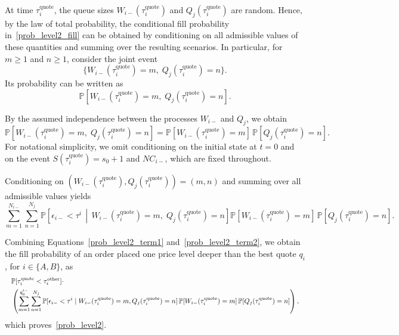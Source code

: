 \documentclass[11pt]{article}
\newenvironment{proof}{\noindent{\it Proof.}}{\hfill\fbox{}\vspace*{1mm}}
\begin{document}
\begin{proof}
At time $\tau_i^{\text{quote}}$, the queue sizes $W_{i-}(\tau_i^{\text{quote}})$ and $Q_j(\tau_i^{\text{quote}})$ are random. Hence, by the law of total probability, the conditional fill probability in~\eqref{prob_level2_fill} can be obtained by conditioning on all admissible values of these quantities and summing over the resulting scenarios. In particular, for $m\geq 1$ and $n\geq 1$, consider the joint event
\[
\{W_{i-}(\tau_i^{\text{quote}})=m,\; Q_j(\tau_i^{\text{quote}})=n\}.
\]
Its probability can be written as
\begin{equation}
\mathbb{P}\!\left[
W_{i-}(\tau_i^{\text{quote}})=m,\;
Q_j(\tau_i^{\text{quote}})=n
\right].
\end{equation}

By the assumed independence between the processes $W_{i-}$ and $Q_j$, we obtain
\begin{equation}\label{prob_level2_combination}
\mathbb{P}\!\left[
W_{i-}(\tau_i^{\text{quote}})=m,\;
Q_j(\tau_i^{\text{quote}})=n
\right]
=
\mathbb{P}[W_{i-}(\tau_i^{\text{quote}})=m]\,
\mathbb{P}[Q_j(\tau_i^{\text{quote}})=n].
\end{equation}
For notational simplicity, we omit conditioning on the initial state at $t=0$ and on the event
$S(\tau_i^{\text{quote}})=s_0+1$ and $NC_{i-}$, which are fixed throughout.

Conditioning on $(W_{i-}(\tau_i^{\text{quote}}),Q_j(\tau_i^{\text{quote}}))=(m,n)$ and summing over all admissible values yields
\begin{equation}\label{prob_level2_term2}
\sum_{m=1}^{N_{i-}}\sum_{n=1}^{N_j}
\mathbb{P}\!\left[
\epsilon_{i-}<\tau^i \,\middle|\,
W_{i-}(\tau_i^{\text{quote}})=m,\;
Q_j(\tau_i^{\text{quote}})=n
\right]
\mathbb{P}[W_{i-}(\tau_i^{\text{quote}})=m]\,
\mathbb{P}[Q_j(\tau_i^{\text{quote}})=n].
\end{equation}

Combining Equations~\eqref{prob_level2_term1} and~\eqref{prob_level2_term2}, we obtain the fill probability of an order placed one price level deeper than the best quote $q_i$, for $i\in\{A,B\}$, as
\[
\resizebox{1.0\hsize}{!}{$
\begin{aligned}
&\mathbb{P}[\tau_i^{\text{quote}}<\tau_i^{\text{other}}]\cdot\\
&\left(\sum_{m=1}^{q_0^{i-}}\sum_{n=1}^{N_j}
\mathbb{P}[\epsilon_{i-}<\tau^i \mid W_{i-}(\tau_i^{\text{quote}})=m,Q_j(\tau_i^{\text{quote}})=n]\,
\mathbb{P}[W_{i-}(\tau_i^{\text{quote}})=m]\,
\mathbb{P}[Q_j(\tau_i^{\text{quote}})=n]
\right),
\end{aligned}
$}
\]
which proves~\eqref{prob_level2}.


\end{proof}
\end{document}
